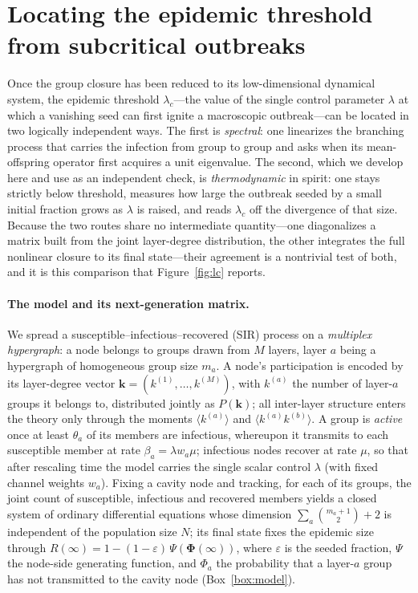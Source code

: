 \documentclass[11pt]{article}
\newcommand{\avg}[1]{\langle #1 \rangle}
\newcommand{\kk}[1]{k^{(#1)}}
\newcommand{\lc}{\lambda_c}
\newcommand{\Rinf}{R(\infty)}
\begin{document}
\section*{Locating the epidemic threshold from subcritical outbreaks}

Once the group closure has been reduced to its low-dimensional dynamical
system, the epidemic threshold $\lc$---the value of the single control
parameter $\lambda$ at which a vanishing seed can first ignite a macroscopic
outbreak---can be located in two logically independent ways. The first is
\emph{spectral}: one linearizes the branching process that carries the
infection from group to group and asks when its mean-offspring operator first
acquires a unit eigenvalue. The second, which we develop here and use as an
independent check, is \emph{thermodynamic} in spirit: one stays strictly below
threshold, measures how large the outbreak seeded by a small initial fraction
grows as $\lambda$ is raised, and reads $\lc$ off the divergence of that size.
Because the two routes share no intermediate quantity---one diagonalizes a
matrix built from the joint layer-degree distribution, the other integrates
the full nonlinear closure to its final state---their agreement is a
nontrivial test of both, and it is this comparison that Figure~\ref{fig:lc}
reports.

\paragraph{The model and its next-generation matrix.}
We spread a susceptible--infectious--recovered (SIR) process on a
\emph{multiplex hypergraph}: a node belongs to groups drawn from $M$ layers,
layer $a$ being a hypergraph of homogeneous group size $m_a$. A node's
participation is encoded by its layer-degree vector $\bm{k}=(\kk{1},\dots,\kk M)$,
with $\kk a$ the number of layer-$a$ groups it belongs to, distributed jointly
as $P(\bm{k})$; all inter-layer structure enters the theory only through the
moments $\avg{\kk a}$ and $\avg{\kk a \kk b}$. A group is \emph{active} once at
least $\theta_a$ of its members are infectious, whereupon it transmits to each
susceptible member at rate $\beta_a=\lambda w_a\mu$; infectious nodes recover
at rate $\mu$, so that after rescaling time the model carries the single scalar
control $\lambda$ (with fixed channel weights $w_a$). Fixing a cavity node and
tracking, for each of its groups, the joint count of susceptible, infectious
and recovered members yields a closed system of ordinary differential
equations whose dimension $\sum_a\binom{m_a+1}{2}+2$ is independent of the
population size $N$; its final state fixes the epidemic size through
$\Rinf=1-(1-\varepsilon)\,\Psi(\bm{\Phi}(\infty))$, where $\varepsilon$ is the
seeded fraction, $\Psi$ the node-side generating function, and $\Phi_a$ the
probability that a layer-$a$ group has not transmitted to the cavity node
(Box~\ref{box:model}).
\end{document}
